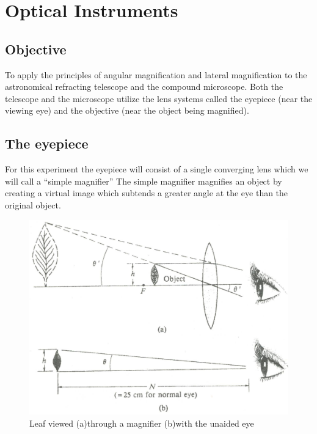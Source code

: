 \chapter{Optical Instruments}

\section{Objective}
To apply the principles of angular magnification and lateral magnification to the astronomical refracting telescope and the compound microscope. Both the telescope and the microscope utilize the lens systems called the eyepiece (near the viewing eye) and the objective (near the object being magnified).

\section{The eyepiece} For this experiment the eyepiece will consist of a single converging lens which we will call a ``simple magnifier'' The simple magnifier magnifies an object by creating a virtual image which subtends a greater angle at the eye than the original object.

\begin{figure} %
  \centering
  \includegraphics[scale=0.7]{5bgraf/mag}
  \caption{Leaf viewed (a)through a magnifier (b)with the unaided eye}
  \label{f:mag}
\end{figure} %



